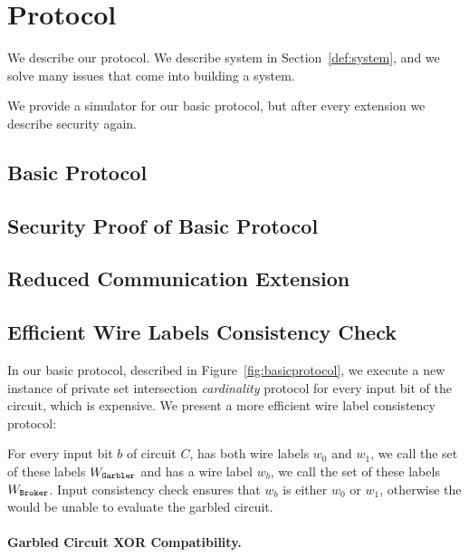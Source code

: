 \section{Protocol}
\label{sec:protocol}

We describe our protocol. We describe system in Section~\ref{def:system}, and
we solve many issues that come into building a system.

We provide a simulator for our basic protocol, but after every extension we
describe security again.


\subsection{Basic Protocol}


\subsection{Security Proof of Basic Protocol}


\subsection{Reduced Communication Extension}


\subsection{Efficient Wire Labels Consistency Check} In our basic
protocol, described in Figure~\ref{fig:basicprotocol}, we execute a new
instance of private set intersection \emph{cardinality} protocol for every
input bit of the circuit, which is expensive.  We present a more efficient wire
label consistency protocol:

For every input bit $b$ of circuit $C$, \garbler has both wire labels $w_0$ and
$w_1$, we call the set of these labels $W_\texttt{Garbler}$ and \broker has a wire
label $w_b$, we call the set of these labels $W_\texttt{Broker}$. Input consistency
check ensures that $w_b$ is either $w_0$ or $w_1$, otherwise the \broker would
be unable to evaluate the garbled circuit.




\paragraph{Garbled Circuit XOR Compatibility.}


